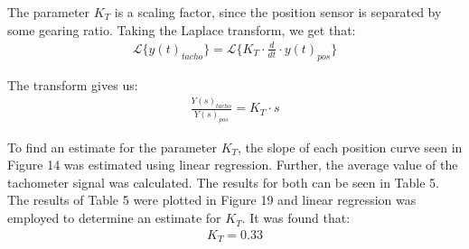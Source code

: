 \documentclass{article}
\begin{document}
The parameter $K_T$ is a scaling factor, since the position sensor is separated by some gearing ratio. Taking the Laplace transform, we get that:
\begin{align*}
	\mathscr{L} \{ y(t)_{tacho} \} = \mathscr{L} \{ K_T \cdot \frac{d}{dt} \cdot y(t)_{pos} \}
\end{align*}

The transform gives us:
\begin{align*}
	\frac{Y(s)_{tacho}}{Y(s)_{pos}} = K_T \cdot s
\end{align*}

To find an estimate for the parameter $K_T$, the slope of each position curve seen in Figure 14 was estimated using linear regression. Further, the average value of the tachometer signal was calculated. The results for both can be seen in Table 5. The results of Table 5 were plotted in Figure 19 and linear regression was employed to determine an estimate for $K_T$. It was found that:
\begin{align*}
	K_T = 0.33
\end{align*}
\end{document}
